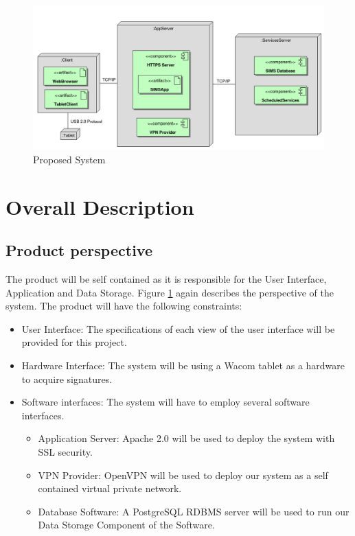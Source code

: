 \documentclass[11pt,a4paper]{report}
\begin{document}
\begin{figure}[htp]
\centering
\includegraphics[scale=0.40]{diagrams/SystemOverview.png}
\caption{Proposed System}
\label{fig:New_Sys}
\end{figure}

\section{Overall Description}

\subsection{Product perspective}
The product will be self contained as it is responsible for the User Interface, Application and Data Storage.
Figure \ref{fig:New_Sys} again describes the perspective of the system.
The product will have the following constraints:
\begin{itemize}
\item User Interface: The specifications of each view of the user interface will be provided for this project.
\item Hardware Interface: The system will be using a Wacom tablet as a hardware to acquire signatures.
\item Software interfaces: The system will have to employ several software interfaces.
\begin{itemize}
\item Application Server: Apache 2.0 will be used to deploy the system with SSL security.
\item VPN Provider: OpenVPN will be used to deploy our system as a self contained virtual private
network.
\item Database Software: A PostgreSQL RDBMS server will be used to run our Data Storage Component of the Software.
\end{itemize}
\end{itemize}
\end{document}
